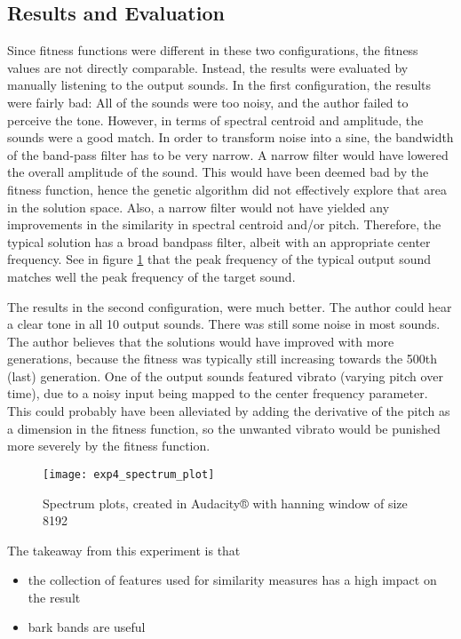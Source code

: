 \subsection{Results and Evaluation}
Since fitness functions were different in these two configurations, the fitness values are not directly comparable. Instead, the results were evaluated by manually listening to the output sounds. In the first configuration, the results were fairly bad: All of the sounds were too noisy, and the author failed to perceive the tone. However, in terms of spectral centroid and amplitude, the sounds were a good match. In order to transform noise into a sine, the bandwidth of the band-pass filter has to be very narrow. A narrow filter would have lowered the overall amplitude of the sound. This would have been deemed bad by the fitness function, hence the genetic algorithm did not effectively explore that area in the solution space. Also, a narrow filter would not have yielded any improvements in the similarity in spectral centroid and/or pitch. Therefore, the typical solution has a broad bandpass filter, albeit with an appropriate center frequency. See in figure \ref{fig:exp4_spectrum_plot} that the peak frequency of the typical output sound matches well the peak frequency of the target sound.

The results in the second configuration, were much better. The author could hear a clear tone in all 10 output sounds. There was still some noise in most sounds. The author believes that the solutions would have improved with more generations, because the fitness was typically still increasing towards the 500th (last) generation. One of the output sounds featured vibrato (varying pitch over time), due to a noisy input being mapped to the center frequency parameter. This could probably have been alleviated by adding the derivative of the pitch as a dimension in the fitness function, so the unwanted vibrato would be punished more severely by the fitness function.

\begin{figure}[h]
    \centering
    \texttt{[image: exp4\_spectrum\_plot]}
    \caption{Spectrum plots, created in Audacity® with hanning window of size 8192}
    \label{fig:exp4_spectrum_plot}
\end{figure}

The takeaway from this experiment is that
\begin{itemize}  
\item the collection of features used for similarity measures has a high impact on the result
\item bark bands are useful
\end{itemize}


